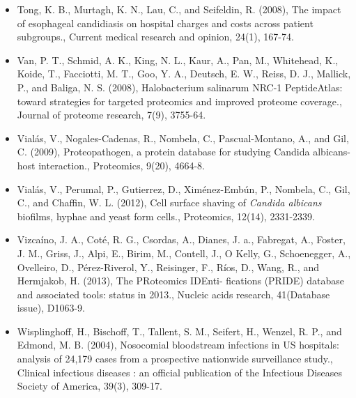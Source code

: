 \begin{itemize}
\item[]{
Tong, K. B., Murtagh, K. N., Lau, C., and Seifeldin, R. (2008), The impact of esophageal 
candidiasis on hospital charges and costs across patient subgroups., Current medical research
and opinion, 24(1), 167-74.
}

\item[]{
Van, P. T., Schmid, A. K., King, N. L., Kaur, A., Pan, M., Whitehead, K., Koide, T., Facciotti,
M. T., Goo, Y. A., Deutsch, E. W., Reiss, D. J., Mallick, P., and Baliga, N. S. (2008), 
Halobacterium salinarum NRC-1 PeptideAtlas: toward strategies for targeted proteomics and
improved proteome coverage., Journal of proteome research, 7(9), 3755-64.
}

\item[]{
Vial\'as, V., Nogales-Cadenas, R., Nombela, C., Pascual-Montano, A., and Gil, C. (2009), 
Proteopathogen, a protein database for studying Candida albicans-host interaction., 
Proteomics, 9(20), 4664-8.
}

\item[]{
Vial\'as, V., Perumal, P., Gutierrez, D., Xim\'enez-Emb\'un, P., Nombela, C., Gil, C., and Chaffin,
W. L. (2012), Cell surface shaving of \textit{Candida albicans} biofilms, hyphae and yeast form
cells., Proteomics, 12(14), 2331-2339.
}

\item[]{
Vizca\'ino, J. A., Cot\'e, R. G., Csordas, A., Dianes, J. a., Fabregat, A., Foster, J. M., Griss, J.,
Alpi, E., Birim, M., Contell, J., O Kelly, G., Schoenegger, A., Ovelleiro, D., P\'erez-Riverol,
Y., Reisinger, F., R\'ios, D., Wang, R., and Hermjakob, H. (2013), The PRoteomics IDEnti-
fications (PRIDE) database and associated tools: status in 2013., Nucleic acids research,
41(Database issue), D1063-9.
}

\item[]{
Wisplinghoff, H., Bischoff, T., Tallent, S. M., Seifert, H., Wenzel, R. P., and Edmond, M. B.
(2004), Nosocomial bloodstream infections in US hospitals: analysis of 24,179 cases from
a prospective nationwide surveillance study., Clinical infectious diseases : an official 
publication of the Infectious Diseases Society of America, 39(3), 309-17.
}



\end{itemize}
